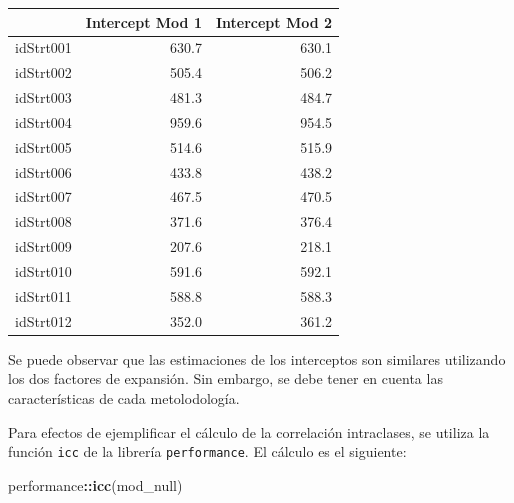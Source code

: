 \documentclass[
  spanish,
  12pt,
]{book}
\newenvironment{Shaded}{\begin{snugshade}}{\end{snugshade}}
\newcommand{\DecValTok}[1]{\textcolor[rgb]{0.00,0.00,0.81}{#1}}
\newcommand{\FunctionTok}[1]{\textcolor[rgb]{0.13,0.29,0.53}{\textbf{#1}}}
\newcommand{\NormalTok}[1]{#1}
\newcommand{\OtherTok}[1]{\textcolor[rgb]{0.56,0.35,0.01}{#1}}
\newcommand{\SpecialCharTok}[1]{\textcolor[rgb]{0.81,0.36,0.00}{\textbf{#1}}}
\newcommand{\StringTok}[1]{\textcolor[rgb]{0.31,0.60,0.02}{#1}}
\begin{document}
\begin{Shaded}
\end{Shaded}

\begin{tabular}{l|r|r}
\hline
  & Intercept Mod 1 & Intercept Mod 2\\
\hline
idStrt001 & 630.7 & 630.1\\
\hline
idStrt002 & 505.4 & 506.2\\
\hline
idStrt003 & 481.3 & 484.7\\
\hline
idStrt004 & 959.6 & 954.5\\
\hline
idStrt005 & 514.6 & 515.9\\
\hline
idStrt006 & 433.8 & 438.2\\
\hline
idStrt007 & 467.5 & 470.5\\
\hline
idStrt008 & 371.6 & 376.4\\
\hline
idStrt009 & 207.6 & 218.1\\
\hline
idStrt010 & 591.6 & 592.1\\
\hline
idStrt011 & 588.8 & 588.3\\
\hline
idStrt012 & 352.0 & 361.2\\
\hline
\end{tabular}

Se puede observar que las estimaciones de los interceptos son similares utilizando los dos factores de expansión. Sin embargo, se debe tener en cuenta las características de cada metolodología.

Para efectos de ejemplificar el cálculo de la correlación intraclases, se utiliza la función \texttt{icc} de la librería \texttt{performance}. El cálculo es el siguiente:

\begin{Shaded}
\begin{Highlighting}[]
\NormalTok{performance}\SpecialCharTok{::}\FunctionTok{icc}\NormalTok{(mod\_null)}
\end{Highlighting}
\end{Shaded}
\end{document}
